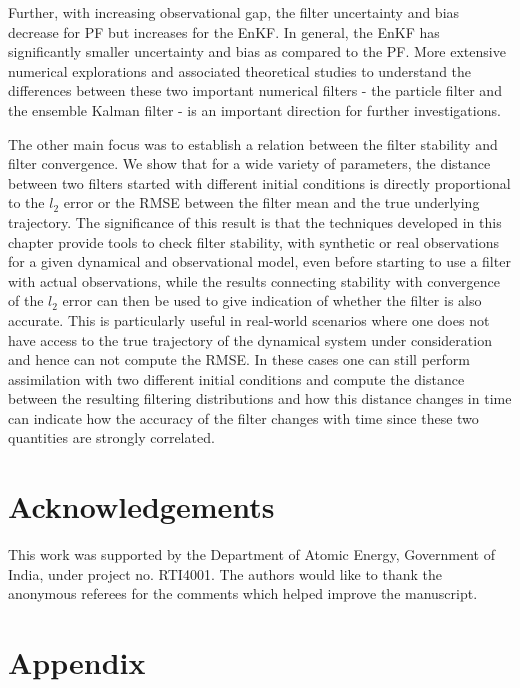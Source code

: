 Further, with increasing observational gap, the filter uncertainty and bias decrease for PF but increases for the EnKF. In general, the EnKF has significantly smaller uncertainty and bias as compared to the PF. More extensive numerical explorations and associated theoretical studies to understand the differences between these two important numerical filters - the particle filter and the ensemble Kalman filter - is an important direction for further investigations.

The other main focus was to establish a relation between the filter stability and filter convergence. We show that for a wide variety of parameters, the distance between two filters started with different initial conditions is directly proportional to the $l_2$ error or the RMSE between the filter mean and the true underlying trajectory. The significance of this result is that the techniques developed in this chapter provide tools to check filter stability, with synthetic or real observations for a given dynamical and observational model, even before starting to use a filter with actual observations, while the results connecting stability with convergence of the $l_2$ error can then be used to give indication of whether the filter is also accurate. This is particularly useful in real-world scenarios where one does not have access to the true trajectory of the dynamical system under consideration and hence can not compute the RMSE. In these cases one can still perform assimilation with two different initial conditions and compute the distance between the resulting filtering distributions and how this distance changes in time can indicate how the accuracy of the filter changes with time since these two quantities are strongly correlated. 

\section*{Acknowledgements}
This work was supported by the Department of Atomic Energy, Government of India, under project no. RTI4001. The authors would like to thank the anonymous referees for the comments which helped improve the manuscript.

\section{Appendix}\label{sec-append--probing-nfs}










